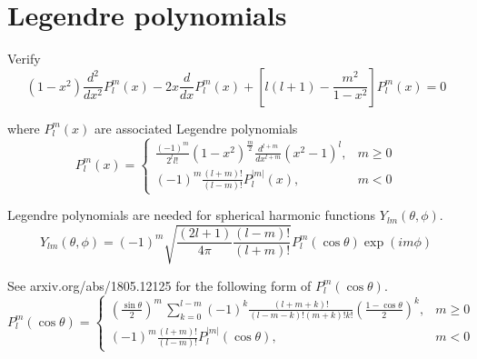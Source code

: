 

\section*{Legendre polynomials}

Verify
\begin{equation*}
(1-x^2)\frac{d^2}{dx^2}P_l^m(x)-2x\frac{d}{dx}P_l^m(x)+\left[l(l+1)-\frac{m^2}{1-x^2}\right]P_l^m(x)=0
\end{equation*}

where $P_l^m(x)$ are associated Legendre polynomials
\begin{equation*}
P_l^m(x)=\begin{cases}
\displaystyle
\frac{(-1)^m}{2^ll!}(1-x^2)^\frac{m}{2}\frac{d^{l+m}}{dx^{l+m}}(x^2-1)^l, & m\ge0
\\[3ex]
\displaystyle
(-1)^m\frac{(l+m)!}{(l-m)!}P_l^{|m|}(x), & m<0
\end{cases}
\end{equation*}

Legendre polynomials are needed for spherical harmonic functions $Y_{lm}(\theta,\phi)$.
\begin{equation*}
Y_{lm}(\theta,\phi)=(-1)^m\sqrt{\frac{(2l+1)}{4\pi}\frac{(l-m)!}{(l+m)!}}
P_l^m(\cos\theta)\exp(im\phi)
\end{equation*}

See arxiv.org/abs/1805.12125 for the following form of $P_l^m(\cos\theta)$.
\begin{equation*}
P_l^m(\cos\theta)=\begin{cases}
\displaystyle
\left(\frac{\sin\theta}{2}\right)^m\,\sum_{k=0}^{l-m}
(-1)^k\frac{(l+m+k)!}{(l-m-k)!(m+k)!k!}
\left(\frac{1-\cos\theta}{2}\right)^k, & m\ge0
\\[4ex]
\displaystyle
(-1)^m\frac{(l+m)!}{(l-m)!}P_l^{|m|}(\cos\theta), & m<0
\end{cases}
\end{equation*}


